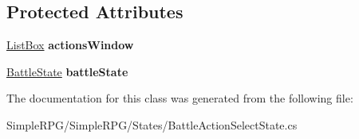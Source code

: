 \subsection*{Protected Attributes}
\begin{DoxyCompactItemize}
\item 
\hypertarget{class_simple_r_p_g_1_1_states_1_1_battle_action_select_state_a39f78e7281767700dfcd8725e0e0febe}{\hyperlink{class_simple_r_p_g_1_1_windows_1_1_list_box}{List\-Box} {\bfseries actions\-Window}}\label{class_simple_r_p_g_1_1_states_1_1_battle_action_select_state_a39f78e7281767700dfcd8725e0e0febe}

\item 
\hypertarget{class_simple_r_p_g_1_1_states_1_1_battle_action_select_state_ae1643c22fb4bbd4d594079fe83dabc60}{\hyperlink{class_simple_r_p_g_1_1_states_1_1_battle_state}{Battle\-State} {\bfseries battle\-State}}\label{class_simple_r_p_g_1_1_states_1_1_battle_action_select_state_ae1643c22fb4bbd4d594079fe83dabc60}

\end{DoxyCompactItemize}


The documentation for this class was generated from the following file\-:\begin{DoxyCompactItemize}
\item 
Simple\-R\-P\-G/\-Simple\-R\-P\-G/\-States/Battle\-Action\-Select\-State.\-cs\end{DoxyCompactItemize}
